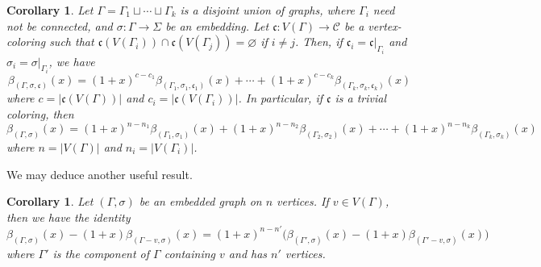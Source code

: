 \documentclass[10pt, reqno]{amsart}
\theoremstyle{plain}
\newtheorem{cor}[theorem]{Corollary}
\theoremstyle{remark}
\theoremstyle{definition}
\numberwithin{equation}{section}
\begin{document}
\begin{cor}\label{cor:disjoint-color}
Let $\Gamma=\Gamma_1\sqcup\cdots\sqcup \Gamma_k$ is a disjoint union of graphs, where $\Gamma_i$ need not be connected, and $\sigma:\Gamma\to\Sigma$ be an embedding. Let $\mathfrak{c}:V(\Gamma)\to\mathcal{C}$ be a vertex-coloring such that $\mathfrak{c}(V(\Gamma_i))\cap \mathfrak{c}(V(\Gamma_j))=\varnothing$ if $i\neq j$. Then, if $\mathfrak{c}_i=\mathfrak{c}|_{\Gamma_i}$ and $\sigma_i=\sigma|_{\Gamma_i}$, we have
\begin{equation}\label{eqn:disjoint-cor}
{\beta}_{(\Gamma,\sigma,\mathfrak{c})}(x)=(1+x)^{c-c_1}{\beta}_{(\Gamma_1,\sigma_1,\mathfrak{c}_1)}(x)+\cdots+(1+x)^{c-c_k}{\beta}_{(\Gamma_k,\sigma_k,\mathfrak{c}_k)}(x)
\end{equation}
where $c=|\mathfrak{c}(V(\Gamma))|$ and $c_i=|\mathfrak{c}(V(\Gamma_i))|$. In particular, if $\mathfrak{c}$ is a trivial coloring, then
\begin{equation}\label{eqn:disjoint-pol}
{\beta}_{(\Gamma, \sigma)}(x)=(1+x)^{n-n_1}{\beta}_{(\Gamma_1,\sigma_1)}(x)+(1+x)^{n-n_2}{\beta}_{(\Gamma_2,\sigma_2)}(x)+\cdots+(1+x)^{n-n_k}{\beta}_{(\Gamma_k,\sigma_k)}(x)
\end{equation}
where $n=|V(\Gamma)|$ and $n_i=|V(\Gamma_i)|$.
\end{cor}
We may deduce another useful result.
\begin{cor}\label{cor:vertex-deletion}
Let $(\Gamma,\sigma)$ be an embedded graph on $n$ vertices. If $v\in V(\Gamma)$, then we have the identity
\begin{equation*}\label{eqn:vertex-deletion}
\beta_{(\Gamma,\sigma)}(x)-(1+x)\beta_{(\Gamma-v,\sigma)}(x)=(1+x)^{n-n'}\big(\beta_{(\Gamma',\sigma)}(x)-(1+x)\beta_{(\Gamma'-v,\sigma)}(x)\big)
\end{equation*}
where $\Gamma'$ is the component of $\Gamma$ containing $v$ and has $n'$ vertices.
\end{cor}
\end{document}
